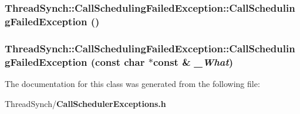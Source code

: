 \subsubsection{\setlength{\rightskip}{0pt plus 5cm}Thread\-Synch::Call\-Scheduling\-Failed\-Exception::Call\-Scheduling\-Failed\-Exception ()\hspace{0.3cm}{\tt  [inline]}}\label{class_thread_synch_1_1_call_scheduling_failed_exception_0150c4355f70edf193101e1672d282f0}


\subsubsection{\setlength{\rightskip}{0pt plus 5cm}Thread\-Synch::Call\-Scheduling\-Failed\-Exception::Call\-Scheduling\-Failed\-Exception (const char $\ast$const \& {\em \_\-What})\hspace{0.3cm}{\tt  [inline]}}\label{class_thread_synch_1_1_call_scheduling_failed_exception_21c87b7603b110f4d4a6525d27e970b5}




The documentation for this class was generated from the following file:\begin{CompactItemize}
\item 
Thread\-Synch/{\bf Call\-Scheduler\-Exceptions.h}\end{CompactItemize}
